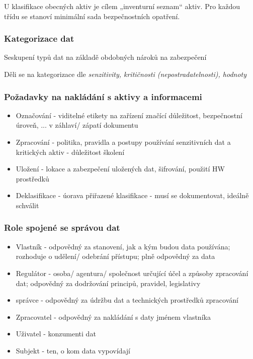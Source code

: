\documentclass[10pt,a4paper]{article}
\begin{document}
U klasifikace obecných aktiv je cílem „inventurní seznam“ aktiv. Pro každou třídu se stanoví minimální sada bezpečnostních opatření.


\subsubsection*{Kategorizace dat}
Seskupení typů dat na základě obdobných nároků na zabezpečení

Děli se na kategorizace dle \textit{senzitivity, kritičnosti (nepostradatelnosti), hodnoty}

\subsubsection*{Požadavky na nakládání s aktivy a informacemi}
\begin{itemize}
    \item Označování - viditelné etikety na zařízení značící důležitost, bezpečnostní úroveň, ... v záhlaví/ zápatí dokumentu
    \item Zpracování - politika, pravidla a postupy používání senzitivních dat a kritických aktiv - důležitost školení
    \item Uložení - lokace a zabezpečení uložených dat, šifrování, použití HW prostředků
    \item Deklasifikace - úorava přiřazené klasifikace - musí se dokumentovat, ideálně schválit
\end{itemize}

\subsubsection*{Role spojené se správou dat}
\begin{itemize}
    \item Vlastník - odpovědný za stanovení, jak a kým budou data používána; rozhoduje o udělení/ odebrání přístupu; plně odpovědný za data
    \item Regulátor - osoba/ agentura/ společnost určující účel a způsoby zpracování dat; odpovědný za dodržování principů, pravidel, legislativy
    \item správce - odpovědný za údržbu dat a technických prostředků zpracování
    \item Zpracovatel - odpovědný za nakládání s daty jménem vlastníka
    \item Uživatel - konzumenti dat
    \item Subjekt - ten, o kom data vypovídají
\end{itemize}
\end{document}

